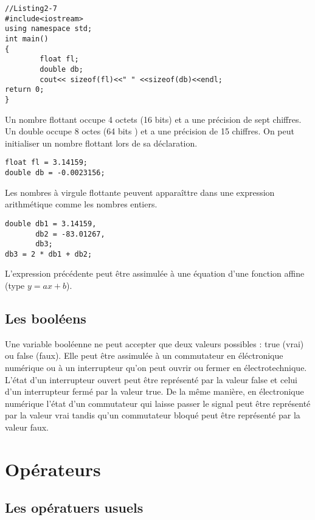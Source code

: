 \documentclass[a4paper, oneside,11pt]{book}
\begin{document}
\begin{lstlisting}
//Listing2-7
#include<iostream>
using namespace std;
int main()
{
        float fl;
        double db;
        cout<< sizeof(fl)<<" " <<sizeof(db)<<endl;
return 0;
}
\end{lstlisting}

Un nombre flottant occupe 4 octets (16 bits) et a une pr\'ecision de sept chiffres. Un double occupe 8 octes (64 bits ) et a une pr\'ecision de 15 chiffres. 
On peut initialiser un nombre flottant lors de sa d\'eclaration.

\begin{lstlisting}
float fl = 3.14159;
double db = -0.0023156;
\end{lstlisting}


Les nombres \`a virgule flottante peuvent appara\^ittre dans une expression arithm\'etique comme les nombres entiers.
\begin{lstlisting}
double db1 = 3.14159,
       db2 = -83.01267,
       db3;
db3 = 2 * db1 + db2;
\end{lstlisting}

L'expression pr\'ec\'edente peut \^etre assimul\'ee \`a une \'equation d'une  fonction affine (type $y=ax+b$).

 
\subsection{Les bool\'eens}
Une variable bool\'eenne ne peut accepter que deux valeurs possibles : true (vrai) 
ou false (faux).
Elle peut \^etre assimul\'ee \`a un commutateur en \'el\'ectronique num\'erique ou \`a
un interrupteur qu'on peut ouvrir ou fermer en \'electrotechnique. L'\'etat d'un 
interrupteur ouvert peut \^etre repr\'esent\'e par la valeur false et celui d'un 
interrupteur ferm\'e par la valeur true. De la m\^eme mani\`ere, en \'electronique
num\'erique l'\'etat d'un commutateur qui laisse passer le signal peut \^etre 
repr\'esent\'e par la valeur vrai tandis qu'un commutateur bloqu\'e peut \^etre 
repr\'esent\'e par la valeur faux.



\section{Op\'erateurs}




\subsection{Les op\'eratuers usuels}
\end{document}
